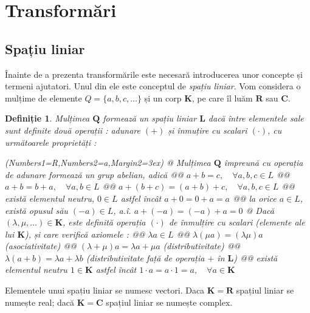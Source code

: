 \section{Transformări}
\label{ch1:sec_transforms}

\subsection{Spațiu liniar}
\label{ch1:sec_transforms:sub_linear_space}
Înainte de a prezenta transformările este necesară introducerea unor concepte și
termeni ajutatori. Unul din ele este conceptul de \textit{spațiu liniar}.
Vom considera o mulțime de elemente $Q = \lbrace a, b, c, \dots \rbrace$ și un
corp $\mathbf{K}$, pe care îl luăm $\mathbf{R}$ sau $\mathbf{C}$.
\newtheorem{theorem_liniar_space}{Definiție}
\begin{theorem_liniar_space}
Mulțimea $\mathbf{Q}$ formează un spațiu liniar $\mathbf{L}$ dacă între
elementele sale sunt definite două operații : adunare $(+)$ și înmuțire cu
scalari $(\cdot)$, cu următoarele proprietăți :
\begin{easylist}
\ListProperties(Numbers1=R,Numbers2=a,Margin2=3ex)
@ Mulțimea $\mathbf{Q}$ împreună cu operația de adunare formează un grup
abelian, adică
@@ $a + b = c, \quad \forall a, b, c \in L$
@@ $a + b = b + a, \quad \forall a,b \in L$
@@ $a + (b + c) = (a + b) + c, \quad \forall a, b, c \in L$
@@ există elementul neutru, $0 \in L$ astfel încât $a + 0 = 0 + a = a$
@@ la orice $a \in L$, există opusul său  $(-a) \in L$, a.î. $a + (-a) = (-a) +
a = 0$
@ Dacă $(\lambda, \mu, \dots) \in \mathbf{K}$, este definită operația
$(\cdot)$ de înmulțire cu scalari (elemente ale lui $\mathbf{K}$), și care verifică
axiomele :
@@ $\lambda a \in L$
@@ $\lambda(\mu a) = (\lambda \mu)a$ (asociativitate)
@@ $(\lambda + \mu)a = \lambda a + \mu a$ (distributivitate)
@@ $\lambda(a + b) = \lambda a + \lambda b$ (distributivitate față de operația
$+$ în $\mathbf{L}$)
@@ există elementul neutru $1 \in \mathbf{K}$ astfel încât $1 \cdot a = a \cdot
1 = a, \quad \forall a \in \mathbf{K}$
\end{easylist}
\end{theorem_liniar_space}
Elementele unui spațiu liniar se numesc vectori. Daca $\mathbf{K} = \mathbf{R}$
spațiul liniar se numește real; dacă $\mathbf{K} = \mathbf{C}$ spațiul liniar se
numește complex.

